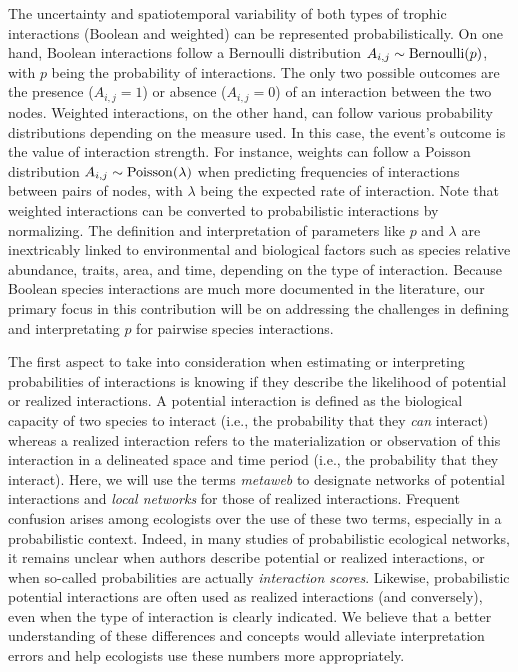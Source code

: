 \documentclass[10pt,oneside]{article}
\begin{document}
The uncertainty and spatiotemporal variability of both types of trophic
interactions (Boolean and weighted) can be represented
probabilistically. On one hand, Boolean interactions follow a Bernoulli
distribution \(A_{i,j} \sim {\rm Bernoulli}(p)\), with \(p\) being the
probability of interactions. The only two possible outcomes are the
presence (\(A_{i,j} = 1\)) or absence (\(A_{i,j} = 0\)) of an
interaction between the two nodes. Weighted interactions, on the other
hand, can follow various probability distributions depending on the
measure used. In this case, the event's outcome is the value of
interaction strength. For instance, weights can follow a Poisson
distribution \(A_{i,j} \sim {\rm Poisson}(\lambda)\) when predicting
frequencies of interactions between pairs of nodes, with \(\lambda\)
being the expected rate of interaction. Note that weighted interactions
can be converted to probabilistic interactions by normalizing. The
definition and interpretation of parameters like \(p\) and \(\lambda\)
are inextricably linked to environmental and biological factors such as
species relative abundance, traits, area, and time, depending on the
type of interaction. Because Boolean species interactions are much more
documented in the literature, our primary focus in this contribution
will be on addressing the challenges in defining and interpretating
\(p\) for pairwise species interactions.

The first aspect to take into consideration when estimating or
interpreting probabilities of interactions is knowing if they describe
the likelihood of potential or realized interactions. A potential
interaction is defined as the biological capacity of two species to
interact (i.e., the probability that they \emph{can} interact) whereas a
realized interaction refers to the materialization or observation of
this interaction in a delineated space and time period (i.e., the
probability that they interact). Here, we will use the terms
\emph{metaweb} to designate networks of potential interactions and
\emph{local networks} for those of realized interactions. Frequent
confusion arises among ecologists over the use of these two terms,
especially in a probabilistic context. Indeed, in many studies of
probabilistic ecological networks, it remains unclear when authors
describe potential or realized interactions, or when so-called
probabilities are actually \emph{interaction scores}. Likewise,
probabilistic potential interactions are often used as realized
interactions (and conversely), even when the type of interaction is
clearly indicated. We believe that a better understanding of these
differences and concepts would alleviate interpretation errors and help
ecologists use these numbers more appropriately.
\end{document}
